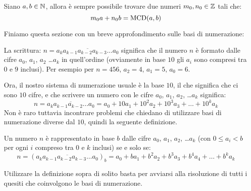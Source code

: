 \documentclass[11pt]{scrartcl}
\begin{document}
	\begin{theorem}
		Siano $a,b \in \mathbb N$, allora è sempre possibile trovare due numeri $m_0,n_0\in \mathbb Z$ tali che:
		$$m_0a+n_0b=\text{MCD}(a,b)$$
	\end{theorem}
	Finiamo questa sezione con un breve approfondimento sulle basi di numerazione:
\begin{definition}
	La scrittura: $n=\overline{a_ka_{k-1}a_{k-2}a_{k-3}\dots a_0}$ significa che il numero $n$ è formato dalle cifre $a_0$, $a_1$, $a_2$ \dots $a_k$ in quell'ordine (ovviamente in base $10$ gli $a_i$ sono compresi tra $0$ e $9$ inclusi). Per esempio per $n=456$, $a_2=4$, $a_1=5$, $a_0=6$.
\end{definition}
	Ora, il nostro sistema di numerazione usuale è la base $10$, il che significa che ci sono $10$ cifre, e che scrivere un numero con le cifre $a_0$, $a_1$, $a_2$, \dots $a_k$ significa:
	$$n=\overline{a_ka_{k-1}a_{k-2}\dots a_0}=a_0+10a_1+10^2a_2+10^3a_3+\dots+10^ka_k$$
	Non è raro tuttavia incontrare problemi che chiedano di utilizzare basi di numerazione diverse dal $10$, quindi la seguente definizione.
	\begin{definition}
		Un numero $n$ è rappresentato in base $b$ dalle cifre $a_0$, $a_1$, $a_2$, \dots $a_k$ (con $0\le a_i<b$ per ogni $i$ compreso tra $0$ e $k$ inclusi) se e solo se:
		$$n=(\overline{a_ka_{k-1}a_{k-2}a_{k-3}\dots a_0})_b=a_0+ba_1+b^2a_2+b^3a_3+b^4a_4+\dots +b^ka_k$$
	\end{definition}
	Utilizzare la definizione sopra di solito basta per avviarsi alla risoluzione di tutti i quesiti che coinvolgono le basi di numerazione. 
\end{document}
